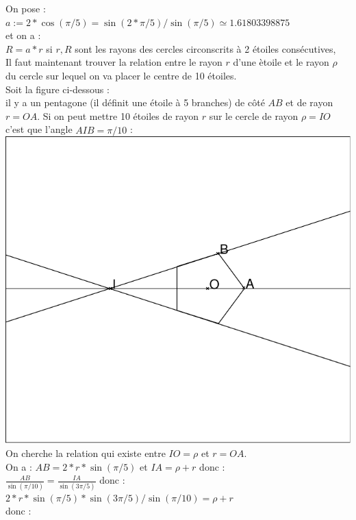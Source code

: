 \documentclass[a4paper,11pt]{book}
\begin{document}
On pose :\\
$a:=2*\cos(\pi/5)=\sin(2*\pi/5)/\sin(\pi/5)\simeq 1.61803398875$\\
et on a :\\
$R=a*r$ si $r,R$ sont les rayons des cercles circonscrits \`a 2 
\'etoiles cons\'ecutives,\\
Il faut maintenant trouver la relation entre le rayon $r$ d'une \`etoile et le 
rayon $\rho$ du cercle sur lequel on va placer le centre de 10 \'etoiles.\\
Soit la figure ci-dessous :\\
 il y a un pentagone (il d\'efinit une \'etoile \`a 5 
branches) de c\^ot\'e $AB$ et de rayon $r=OA$.
Si on peut mettre 10 \'etoiles de rayon $r$ sur le cercle de rayon $\rho=IO$ 
c'est que l'angle $\widehat{AIB}=\pi/10$ :\\
\includegraphics[width=\textwidth]{casetoil0}\\
On cherche la relation qui existe entre $IO=\rho$ et $r=OA$.\\
On a :
$AB=2*r*\sin(\pi/5)$ et $IA=\rho+r$ donc :\\
$\displaystyle \frac{AB}{\sin(\pi/10)}= \frac{IA}{\sin(3\pi/5)}$ donc :\\
$2*r*\sin(\pi/5)*\sin(3\pi/5)/\sin(\pi/10)=\rho+r$\\
donc :\\
\end{document}
